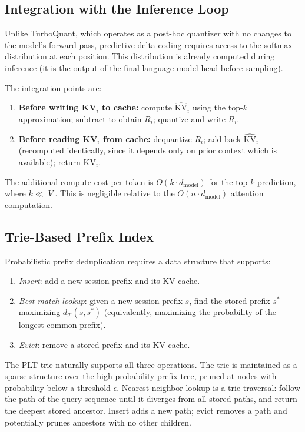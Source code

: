 \documentclass[11pt]{article}
\begin{document}
\subsection{Integration with the Inference Loop}

Unlike TurboQuant, which operates as a post-hoc quantizer with no changes to the
model's forward pass, predictive delta coding requires access to the softmax
distribution at each position.  This distribution is already computed during
inference (it is the output of the final language model head before sampling).

The integration points are:
\begin{enumerate}[leftmargin=2em]
  \item \textbf{Before writing KV$_i$ to cache:} compute $\widehat{\mathrm{KV}}_i$
        using the top-$k$ approximation; subtract to obtain $R_i$; quantize and
        write $R_i$.
  \item \textbf{Before reading KV$_i$ from cache:} dequantize $R_i$; add back
        $\widehat{\mathrm{KV}}_i$ (recomputed identically, since it depends only
        on prior context which is available); return $\mathrm{KV}_i$.
\end{enumerate}

The additional compute cost per token is $O(k \cdot d_{\mathrm{model}})$ for the top-$k$
prediction, where $k \ll |V|$.  This is negligible relative to the $O(n \cdot d_{\mathrm{model}})$
attention computation.

\subsection{Trie-Based Prefix Index}

Probabilistic prefix deduplication requires a data structure that supports:
\begin{enumerate}[leftmargin=2em]
  \item \emph{Insert}: add a new session prefix and its KV cache.
  \item \emph{Best-match lookup}: given a new session prefix $s$, find
        the stored prefix $s^*$ maximizing $d_{\mathcal{T}}(s, s^*)$
        (equivalently, maximizing the probability of the longest common prefix).
  \item \emph{Evict}: remove a stored prefix and its KV cache.
\end{enumerate}

The PLT trie naturally supports all three operations.  The trie is maintained
as a sparse structure over the high-probability prefix tree, pruned at nodes with
probability below a threshold $\epsilon$.  Nearest-neighbor lookup is a
trie traversal: follow the path of the query sequence until it diverges from
all stored paths, and return the deepest stored ancestor.  Insert adds a new
path; evict removes a path and potentially prunes ancestors with no other children.
\end{document}
